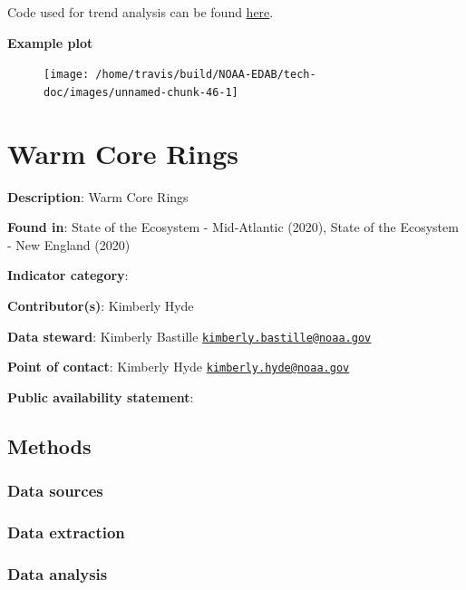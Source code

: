 \documentclass[
]{book}
\begin{document}
Code used for trend analysis can be found \href{https://github.com/NOAA-EDAB/tech-doc/blob/master/R/stored_scripts/trend_analysis.R}{here}.

\textbf{Example plot}

\begin{figure}

{\centering \texttt{[image: /home/travis/build/NOAA-EDAB/tech-doc/images/unnamed-chunk-46-1]} 

}

\end{figure}

\hypertarget{warm-core-rings}{%
\chapter{Warm Core Rings}\label{warm-core-rings}}

\textbf{Description}: Warm Core Rings

\textbf{Found in}: State of the Ecosystem - Mid-Atlantic (2020), State of the Ecosystem - New England (2020)

\textbf{Indicator category}:

\textbf{Contributor(s)}: Kimberly Hyde

\textbf{Data steward}: Kimberly Bastille \href{mailto:kimberly.bastille@noaa.gov}{\nolinkurl{kimberly.bastille@noaa.gov}}

\textbf{Point of contact}: Kimberly Hyde \href{mailto:kimberly.hyde@noaa.gov}{\nolinkurl{kimberly.hyde@noaa.gov}}

\textbf{Public availability statement}:

\hypertarget{methods-43}{%
\section{Methods}\label{methods-43}}

\hypertarget{data-sources-43}{%
\subsection{Data sources}\label{data-sources-43}}

\hypertarget{data-extraction-34}{%
\subsection{Data extraction}\label{data-extraction-34}}

\hypertarget{data-analysis-41}{%
\subsection{Data analysis}\label{data-analysis-41}}
\end{document}
